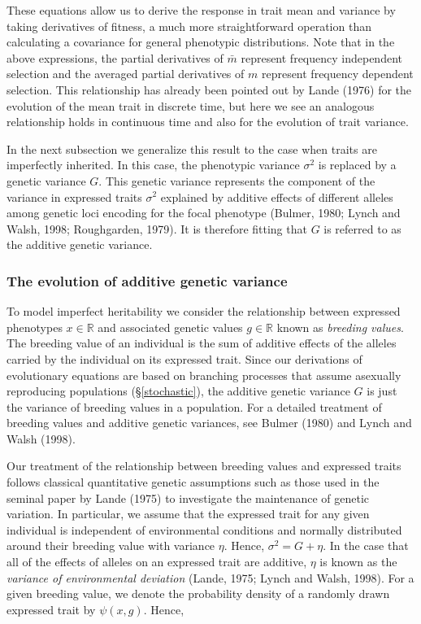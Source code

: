 \documentclass[]{elsarticle} %
\begin{document}
These equations allow us to derive the response in trait mean and
variance by taking derivatives of fitness, a much more straightforward
operation than calculating a covariance for general phenotypic
distributions. Note that in the above expressions, the partial
derivatives of \(\bar m\) represent frequency independent selection and
the averaged partial derivatives of \(m\) represent frequency dependent
selection. This relationship has already been pointed out by Lande
(1976) for the evolution of the mean trait in discrete time, but here we
see an analogous relationship holds in continuous time and also for the
evolution of trait variance.

In the next subsection we generalize this result to the case when traits
are imperfectly inherited. In this case, the phenotypic variance
\(\sigma^2\) is replaced by a genetic variance \(G\). This genetic
variance represents the component of the variance in expressed traits
\(\sigma^2\) explained by additive effects of different alleles among
genetic loci encoding for the focal phenotype (Bulmer, 1980; Lynch and
Walsh, 1998; Roughgarden, 1979). It is therefore fitting that \(G\) is
referred to as the additive genetic variance.

\hypertarget{the-evolution-of-additive-genetic-variance}{%
\subsubsection{\texorpdfstring{The evolution of additive genetic
variance
\label{inheritance}}{The evolution of additive genetic variance }}\label{the-evolution-of-additive-genetic-variance}}

To model imperfect heritability we consider the relationship between
expressed phenotypes \(x\in\mathbb{R}\) and associated genetic values
\(g\in\mathbb{R}\) known as \emph{breeding values}. The breeding value
of an individual is the sum of additive effects of the alleles carried
by the individual on its expressed trait. Since our derivations of
evolutionary equations are based on branching processes that assume
asexually reproducing populations (\S\ref{stochastic}), the additive
genetic variance \(G\) is just the variance of breeding values in a
population. For a detailed treatment of breeding values and additive
genetic variances, see Bulmer (1980) and Lynch and Walsh (1998).

Our treatment of the relationship between breeding values and expressed
traits follows classical quantitative genetic assumptions such as those
used in the seminal paper by Lande (1975) to investigate the maintenance
of genetic variation. In particular, we assume that the expressed trait
for any given individual is independent of environmental conditions and
normally distributed around their breeding value with variance \(\eta\).
Hence, \(\sigma^2=G+\eta\). In the case that all of the effects of
alleles on an expressed trait are additive, \(\eta\) is known as the
\emph{variance of environmental deviation} (Lande, 1975; Lynch and
Walsh, 1998). For a given breeding value, we denote the probability
density of a randomly drawn expressed trait by \(\psi(x,g)\). Hence,
\end{document}
